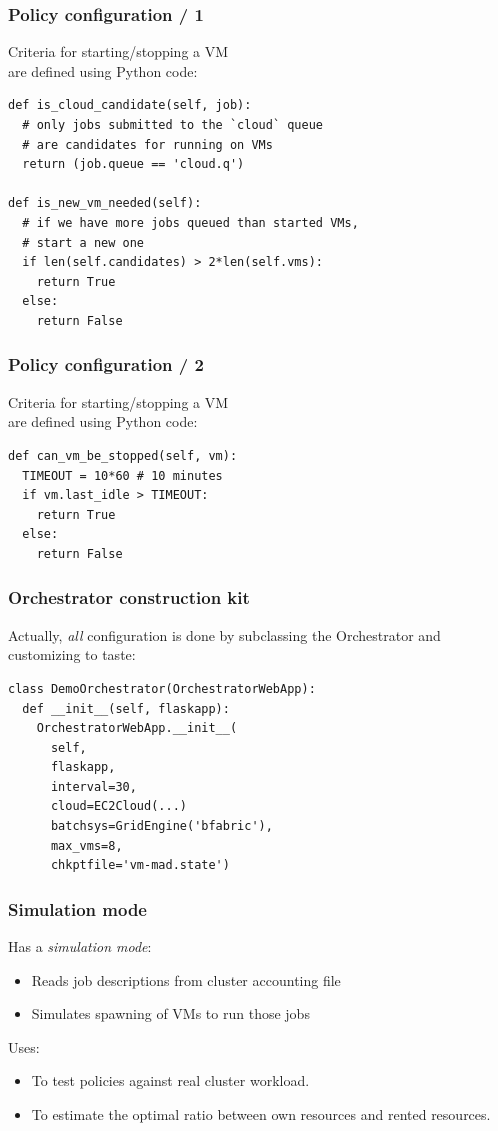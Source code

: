 \documentclass[english,serif,mathserif,xcolor=pdftex,dvipsnames,table]{beamer}
\begin{document}
\begin{frame}[fragile]
  \frametitle{Policy configuration / 1}
  Criteria for starting/stopping a VM \\
  are defined using Python code:
  
  \+
  \begin{lstlisting}
def is_cloud_candidate(self, job):
  # only jobs submitted to the `cloud` queue 
  # are candidates for running on VMs
  return (job.queue == 'cloud.q')

def is_new_vm_needed(self):
  # if we have more jobs queued than started VMs, 
  # start a new one
  if len(self.candidates) > 2*len(self.vms):
    return True
  else:
    return False
    \end{lstlisting}
\end{frame}


\begin{frame}[fragile]
  \frametitle{Policy configuration / 2}
  Criteria for starting/stopping a VM \\
  are defined using Python code:
  
  \+
  \begin{lstlisting}
def can_vm_be_stopped(self, vm):
  TIMEOUT = 10*60 # 10 minutes
  if vm.last_idle > TIMEOUT:
    return True
  else:
    return False
  \end{lstlisting}
\end{frame}


\begin{frame}[fragile]
  \frametitle{Orchestrator construction kit}
  Actually, \emph{all} configuration is done by subclassing the
  Orchestrator and customizing to taste:
  \begin{lstlisting}
class DemoOrchestrator(OrchestratorWebApp):
  def __init__(self, flaskapp):
    OrchestratorWebApp.__init__(
      self,
      flaskapp,
      interval=30,
      cloud=EC2Cloud(...)
      batchsys=GridEngine('bfabric'),
      max_vms=8,
      chkptfile='vm-mad.state')
  \end{lstlisting}
\end{frame}


\begin{frame}
  \frametitle{Simulation mode}
  Has a \emph{simulation mode}:
  \begin{itemize}
  \item Reads job descriptions from cluster accounting file
  \item Simulates spawning of VMs to run those jobs
  \end{itemize}

  \+
  Uses:
  \begin{itemize}
  \item   To test policies against real cluster workload.
  \item   To estimate the optimal ratio between own resources and rented resources.
  \end{itemize}
\end{frame}
\end{document}
